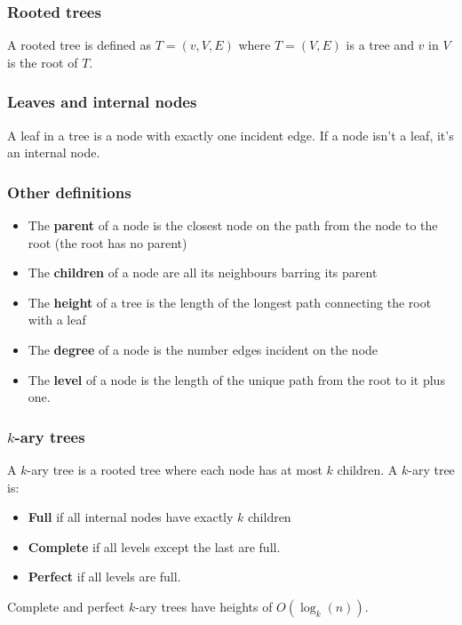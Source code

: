 \documentclass[a4paper, 12pt, twoside]{article}
\begin{document}
\subsubsection{Rooted trees}

A rooted tree is defined as $T = (v, V, E)$ where $T = (V, E)$ is a
tree and $v$ in $V$ is the root of $T$.

\subsubsection{Leaves and internal nodes}

A leaf in a tree is a node with exactly one incident edge. If a node
isn't a leaf, it's an internal node.

\subsubsection{Other definitions}

\begin{itemize}
      \item The \textbf{parent} of a node is the closest node on
      the path from the node to the root (the root has no parent)
      \item The \textbf{children} of a node are all its neighbours
      barring its parent
      \item The \textbf{height} of a tree is the length of the
      longest path connecting the root with a leaf
      \item The \textbf{degree} of a node is the number edges
      incident on the node
      \item The \textbf{level} of a node is the length of the unique path
      from the root to it plus one.
\end{itemize}

\subsubsection{$k$-ary trees}

A $k$-ary tree is a rooted tree where each node has at most $k$
children. A $k$-ary tree is:
\begin{itemize}
      \item \textbf{Full} if all internal nodes have exactly 
      $k$ children
      \item \textbf{Complete} if all levels except the last are full.
      \item \textbf{Perfect} if all levels are full.
\end{itemize}
Complete and perfect $k$-ary trees have heights of $O(\log_k(n))$.
\end{document}
